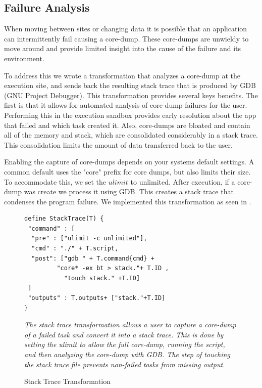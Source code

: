 \documentclass[conference]{IEEEtran}
\begin{document}
\subsection{Failure Analysis}

When moving between sites or changing data
it is possible that an application can intermittently
fail causing a core-dump.
These core-dumps are unwieldy to move around and 
provide limited insight into the cause of the failure
and its environment. 

To address this we wrote a transformation that analyzes 
a core-dump at the execution site, and sends back the
resulting stack trace that is produced by GDB (GNU Project Debugger).
This transformation provides several keys benefits.
The first is that it allows for automated analysis of
core-dump failures for the user. Performing this in the 
execution sandbox provides early resolution about the
app that failed and which task created it.
Also, core-dumps are bloated and 
contain all of the memory and stack,
which are consolidated considerably in
a stack trace. 
This consolidation limits the amount of data 
transferred back to the user. 


Enabling the capture of core-dumps depends
on your systems default settings.
A common default uses the "core" prefix for
core dumps, but also limits their size. 
To accommodate this, we set the $ulimit$
to unlimited. After execution, if a 
core-dump was create we process it using GDB.
This creates a stack trace that condenses
the program failure.
We implemented this transformation as 
seen in .

\begin{figure}[H]
\begin{framed}
\small
\begin{verbatim}
define StackTrace(T) {
 "command" : [
  "pre" : ["ulimit -c unlimited"],
  "cmd" : "./" + T.script,
  "post": ["gdb " + T.command{cmd} +
         "core* -ex bt > stack."+ T.ID ,
           "touch stack." +T.ID]
 ]
 "outputs" : T.outputs+ ["stack."+T.ID]
}
\end{verbatim}
\end{framed}
\caption{Stack Trace Transformation}
\small
\emph{The stack trace transformation allows a user
to capture a core-dump of a failed task and 
convert it into a stack trace. 
This is done by setting the ulimit 
to allow the full core-dump, running the script,
and then analyzing the core-dump with GDB.
The step of touching the stack trace
file prevents non-failed tasks from missing output.}
\label{stacktrace}
\end{figure}
\end{document}
